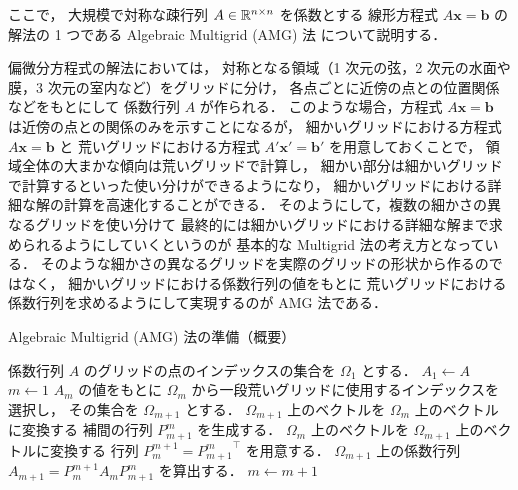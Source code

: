 
ここで，
大規模で対称な疎行列 $A \in \mathbb{R}^{n \times n}$ を係数とする
線形方程式 $A \bm{x} = \bm{b}$ の解法の 1 つである
Algebraic Multigrid (AMG) 法
\cite{Ruge1987}
について説明する．

偏微分方程式の解法においては，
対称となる領域（1 次元の弦，2 次元の水面や膜，3 次元の室内など）をグリッドに分け，
各点ごとに近傍の点との位置関係などをもとにして
係数行列 $A$ が作られる．
このような場合，方程式 $A \bm{x} = \bm{b}$ は近傍の点との関係のみを示すことになるが，
細かいグリッドにおける方程式 $A \bm{x} = \bm{b}$ と
荒いグリッドにおける方程式 $A' \bm{x}' = \bm{b}'$ を用意しておくことで，
領域全体の大まかな傾向は荒いグリッドで計算し，
細かい部分は細かいグリッドで計算するといった使い分けができるようになり，
細かいグリッドにおける詳細な解の計算を高速化することができる．
そのようにして，複数の細かさの異なるグリッドを使い分けて
最終的には細かいグリッドにおける詳細な解まで求められるようにしていくというのが
基本的な Multigrid 法の考え方となっている．
そのような細かさの異なるグリッドを実際のグリッドの形状から作るのではなく，
細かいグリッドにおける係数行列の値をもとに
荒いグリッドにおける係数行列を求めるようにして実現するのが
AMG 法である．

\begin{algorithm}[tp]
    \caption{Algebraic Multigrid (AMG) 法の準備（概要） \cite{Ruge1987,Wolters2002}}
    \label{alg:matrix-computation_amg_setup}
    \begin{algorithmic}[1]
        \State 係数行列 $A$ のグリッドの点のインデックスの集合を $\Omega_1$ とする．
        \State $A_1 \gets A$
        \State $m \gets 1$
        \Loop
        \State $A_m$ の値をもとに $\Omega_m$ から一段荒いグリッドに使用するインデックスを選択し，
        その集合を $\Omega_{m+1}$ とする．
        \State $\Omega_{m+1}$ 上のベクトルを $\Omega_{m}$ 上のベクトルに変換する
        補間の行列 $P_{m+1}^{m}$ を生成する．
        \State $\Omega_{m}$ 上のベクトルを $\Omega_{m+1}$ 上のベクトルに変換する
        行列 $P_{m}^{m+1} = {P_{m+1}^{m}}^\top$ を用意する．
        \State $\Omega_{m+1}$ 上の係数行列 $A_{m+1} = P_{m}^{m+1} A_{m} P_{m+1}^{m}$ を算出する．
        \State \Return
        \EndIf
        \State $m \gets m + 1$
        \EndLoop
        \EndProcedure
    \end{algorithmic}
\end{algorithm}

